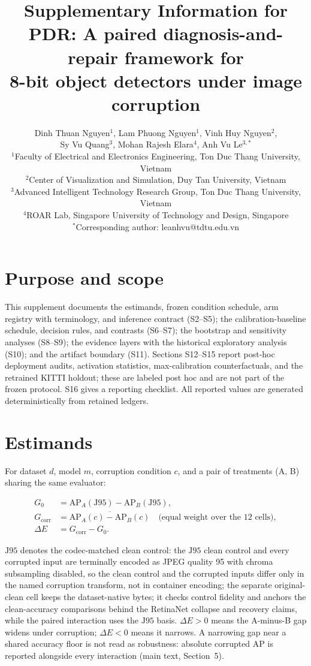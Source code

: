 \documentclass[10pt]{article}
\title{Supplementary Information for\\[1mm]
\textbf{PDR: A paired diagnosis-and-repair framework for\\ 8-bit object detectors under image corruption}}
\author{Dinh Thuan Nguyen$^{1}$, Lam Phuong Nguyen$^{1}$, Vinh Huy Nguyen$^{2}$,\\
Sy Vu Quang$^{3}$, Mohan Rajesh Elara$^{4}$, Anh Vu Le$^{3,*}$\\[2mm]
\small $^1$Faculty of Electrical and Electronics Engineering, Ton Duc Thang University, Vietnam\\
\small $^2$Center of Visualization and Simulation, Duy Tan University, Vietnam\\
\small $^3$Advanced Intelligent Technology Research Group, Ton Duc Thang University, Vietnam\\
\small $^4$ROAR Lab, Singapore University of Technology and Design, Singapore\\
\small $^*$Corresponding author: leanhvu@tdtu.edu.vn}
\date{}
\newcommand{\AP}{\mathrm{AP}}
\newcommand{\Jclean}{\mathrm{J95}}
\begin{document}
\maketitle

\section{Purpose and scope}

This supplement documents the estimands, frozen condition schedule, arm
registry with terminology, and inference contract (S2--S5); the
calibration-baseline schedule, decision rules, and contrasts (S6--S7); the
bootstrap and sensitivity analyses (S8--S9); the evidence layers with the
historical exploratory analysis (S10); and the artifact boundary (S11).
Sections S12--S15 report post-hoc deployment audits, activation
statistics, max-calibration counterfactuals, and the retrained KITTI holdout;
these are labeled post hoc and are not part of the frozen protocol. S16 gives
a reporting checklist. All reported values are generated deterministically from retained ledgers.

\section{Estimands}

For dataset $d$, model $m$, corruption condition $c$, and a pair of treatments
(A, B) sharing the same evaluator:

\begin{align}
G_0 &= \AP_A(\Jclean) - \AP_B(\Jclean), \\
G_{\mathrm{corr}} &= \overline{\AP_A(c) - \AP_B(c)} \quad\text{(equal weight over the 12 cells)}, \\
\Delta E &= G_{\mathrm{corr}} - G_0 .
\end{align}

$\Jclean$ denotes the codec-matched clean control: the $\Jclean$ clean control
and every corrupted input are terminally encoded as JPEG quality 95 with
chroma subsampling disabled, so the clean control and the corrupted inputs
differ only in the named corruption transform, not in container encoding; the
separate original-clean cell keeps the dataset-native bytes; it checks
control fidelity and anchors the clean-accuracy comparisons behind the
RetinaNet collapse and recovery claims, while the paired interaction uses
the $\Jclean$ basis. $\Delta E > 0$ means the A-minus-B gap widens under
corruption; $\Delta E < 0$ means it narrows. A narrowing gap near a shared
accuracy floor is not read as robustness: absolute corrupted AP is reported
alongside every interaction (main text, Section~5).
\end{document}
